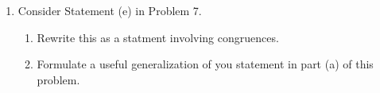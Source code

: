 \documentclass[12pt]{article}
\begin{document}
\begin{enumerate}
\item Consider Statement (e) in Problem 7.
  \begin{enumerate}
  \item  Rewrite this as a statment involving congruences.
  \item  Formulate a useful generalization of you statement in part (a) of this problem.
  \end{enumerate}


\end{enumerate}
\end{document}

